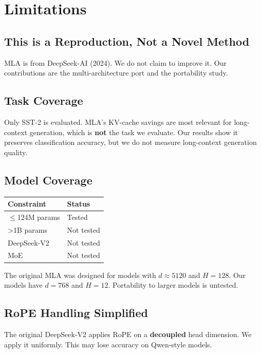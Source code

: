 
\section{Limitations}

\subsection{This is a Reproduction, Not a Novel Method}

MLA is from DeepSeek-AI (2024). We do not claim to improve it. Our 
contributions are the multi-architecture port and the portability study.

\subsection{Task Coverage}

Only SST-2 is evaluated. MLA's KV-cache savings are most relevant for 
long-context generation, which is \textbf{not} the task we evaluate. Our results 
show it preserves classification accuracy, but we do not measure 
long-context generation quality.

\subsection{Model Coverage}

\begin{table}[H]
\centering
\small
\begin{tabular}{ll}
\toprule
\textbf{Constraint} & \textbf{Status} \\
\midrule
$\le$124M params & Tested \\
\textgreater{}1B params & Not tested \\
DeepSeek-V2 & Not tested \\
MoE & Not tested \\
\bottomrule
\end{tabular}
\end{table}

The original MLA was designed for models with $d \approx 5120$ and 
$H = 128$. Our models have $d = 768$ and $H = 12$. Portability to 
larger models is untested.

\subsection{RoPE Handling Simplified}

The original DeepSeek-V2 applies RoPE on a \textbf{decoupled} head dimension. We 
apply it uniformly. This may lose accuracy on Qwen-style models.

